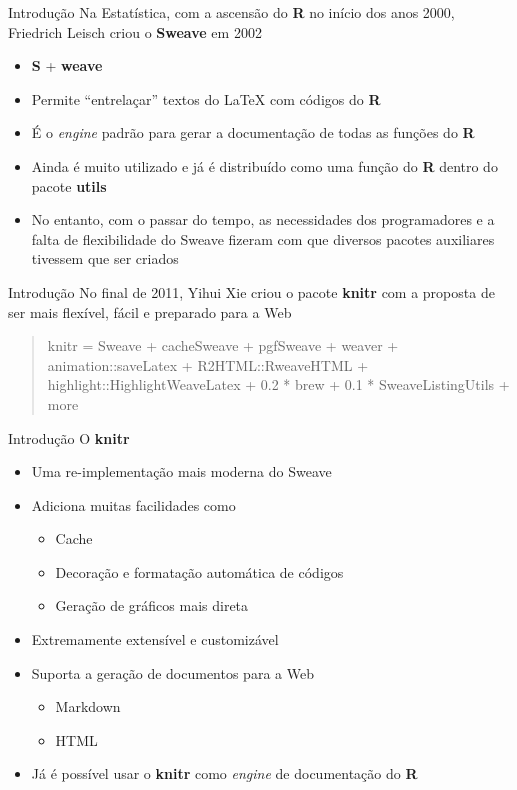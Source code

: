 \documentclass{beamer}\usepackage[]{graphicx}\usepackage[]{color}
\providecommand{\R}{\textbf{R}\xspace}
\providecommand{\knitr}{\textbf{knitr}\xspace}
\begin{document}
\begin{frame}{Introdução}
  Na Estatística, com a ascensão do \R no início dos anos 2000,
  Friedrich Leisch criou o \textbf{Sweave} em 2002
  \begin{itemize}
  \item \textbf{S} + \textbf{weave}
  \item Permite ``entrelaçar'' textos do \LaTeX{} com códigos do \R
  \item É o \textit{engine} padrão para gerar a documentação de todas as
    funções do \R
  \item Ainda é muito utilizado e já é distribuído como uma função do \R
    dentro do pacote \textbf{utils}
  \item No entanto, com o passar do tempo, as necessidades dos
    programadores e a falta de flexibilidade do Sweave fizeram com que
    diversos pacotes auxiliares tivessem que ser criados
  \end{itemize}
\end{frame}

\begin{frame}{Introdução}
  No final de 2011, Yihui Xie criou o pacote \textbf{knitr} com a
  proposta de ser mais flexível, fácil e preparado para a Web
  \begin{quote}
    knitr = Sweave + cacheSweave + pgfSweave + weaver +
    animation::saveLatex + R2HTML::RweaveHTML +
    highlight::HighlightWeaveLatex + 0.2 * brew + 0.1 *
    SweaveListingUtils + more
  \end{quote}
\end{frame}

\begin{frame}{Introdução}
O \textbf{knitr}
\begin{itemize}
\item Uma re-implementação mais moderna do Sweave
\item Adiciona muitas facilidades como
  \begin{itemize}
  \item Cache
  \item Decoração e formatação automática de códigos
  \item Geração de gráficos mais direta
  \end{itemize}
\item Extremamente extensível e customizável
\item Suporta a geração de documentos para a Web
  \begin{itemize}
  \item Markdown
  \item HTML
  \end{itemize}
\item Já é possível usar o \knitr como \textit{engine} de documentação
  do \R
\end{itemize}
\end{frame}
\end{document}
